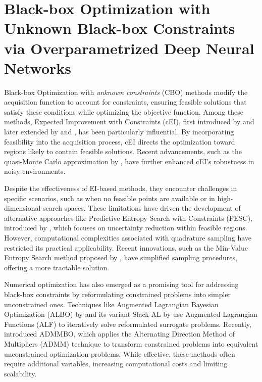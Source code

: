 \chapter{Black-box Optimization with Unknown Black-box Constraints via Overparametrized Deep Neural Networks} %

\label{chap:neural-cbo} %

Black-box Optimization with \textit{unknown constraints} (CBO) methods modify the acquisition function to account for constraints, ensuring feasible solutions that satisfy these conditions while optimizing the objective function. Among these methods, Expected Improvement with Constraints (cEI), first introduced by \citet{schonlau1998global} and later extended by \citet{gardner2014bayesian} and \citet{gelbart2014bayesian}, has been particularly influential. By incorporating feasibility into the acquisition process, cEI directs the optimization toward regions likely to contain feasible solutions. Recent advancements, such as the quasi-Monte Carlo approximation by \citet{letham2019constrained}, have further enhanced cEI's robustness in noisy environments.

Despite the effectiveness of EI-based methods, they encounter challenges in specific scenarios, such as when no feasible points are available or in high-dimensional search spaces. These limitations have driven the development of alternative approaches like Predictive Entropy Search with Constraints (PESC), introduced by \citet{hernandez2015predictive}, which focuses on uncertainty reduction within feasible regions. However, computational complexities associated with quadrature sampling have restricted its practical applicability. Recent innovations, such as the Min-Value Entropy Search method proposed by \citet{takeno2022sequential}, have simplified sampling procedures, offering a more tractable solution.

Numerical optimization has also emerged as a promising tool for addressing black-box constraints by reformulating constrained problems into simpler unconstrained ones. Techniques like Augmented Lagrangian Bayesian Optimization (ALBO) by \citet{gramacy2016modeling} and its variant Slack-AL by \citet{picheny2016bayesian} use Augmented Lagrangian Functions (ALF) to iteratively solve reformulated surrogate problems. Recently, \citet{ariafar2019admmbo} introduced ADMMBO, which applies the Alternating Direction Method of Multipliers (ADMM) technique to transform constrained problems into equivalent unconstrained optimization problems. While effective, these methods often require additional variables, increasing computational costs and limiting scalability.

